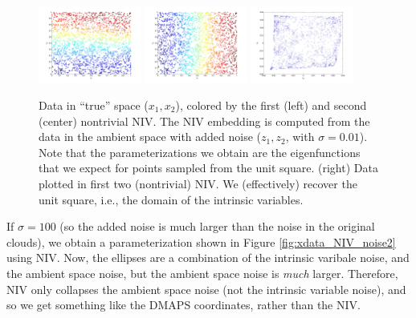 \documentclass[12pt]{article}
\begin{document}
\begin{figure}[htb]
\includegraphics[width=0.3\textwidth]{xdata_noise1_colored_NIV1}
\includegraphics[width=0.3\textwidth]{xdata_noise1_colored_NIV2}
\includegraphics[width=0.3\textwidth]{embedding_noise1}
\caption{Data in ``true'' space ($x_1, x_2$), colored by the first (left) and second (center) nontrivial NIV. The NIV embedding is computed from the data in the ambient space with added noise ($z_1, z_2$, with $\sigma = 0.01$). Note that the parameterizations we obtain are the eigenfunctions that we expect for points sampled from the unit square. (right) Data plotted in first two (nontrivial) NIV. We (effectively) recover the unit square, i.e., the domain of the intrinsic variables. }
\label{fig:xdata_NIV_noise1}
\end{figure}

If $\sigma = 100$ (so the added noise is much larger than the noise in the original clouds), we obtain a parameterization shown in Figure \ref{fig:xdata_NIV_noise2} using NIV.
%
Now, the ellipses are a combination of the intrinsic varibale noise, and the ambient space noise, but the ambient space noise is {\em much} larger. 
%
Therefore, NIV only collapses the ambient space noise (not the intrinsic variable noise), and so we get something like the DMAPS coordinates, rather than the NIV. 
\end{document}
